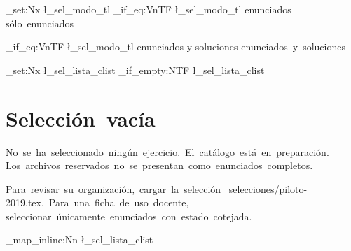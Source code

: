 \NewDocumentCommand{\EtiquetaModo}{}
  {
    \tl_set:Nx \l_sel_modo_tl {\ModoSalida}
    \str_if_eq:VnTF \l_sel_modo_tl {enunciados}
      {sólo~enunciados}
      {
        \str_if_eq:VnTF \l_sel_modo_tl {enunciados-y-soluciones}
          {enunciados~y~soluciones}
          {\PackageError{selectividad}{ModoSalida~no~valido}{Usar~enunciados~o~enunciados-y-soluciones.}}
      }
  }

\NewDocumentCommand{\MostrarSeleccion}{}
  {
    \clist_set:Nx \l_sel_lista_clist {\ListaEjercicios}
    \clist_if_empty:NTF \l_sel_lista_clist
      {
        \section*{Selección~vacía}
        No~se~ha~seleccionado~ningún~ejercicio.~El~catálogo~está~en~preparación.~
        Los~archivos~reservados~no~se~presentan~como~enunciados~completos.\par
        Para~revisar~su~organización,~cargar~la~selección~
        \textnormal{selecciones/piloto-2019.tex}.~Para~una~ficha~de~uso~docente,~
        seleccionar~únicamente~enunciados~con~estado~\textnormal{cotejada}.
      }
      {\clist_map_inline:Nn \l_sel_lista_clist {}}
  }
\ExplSyntaxOff
